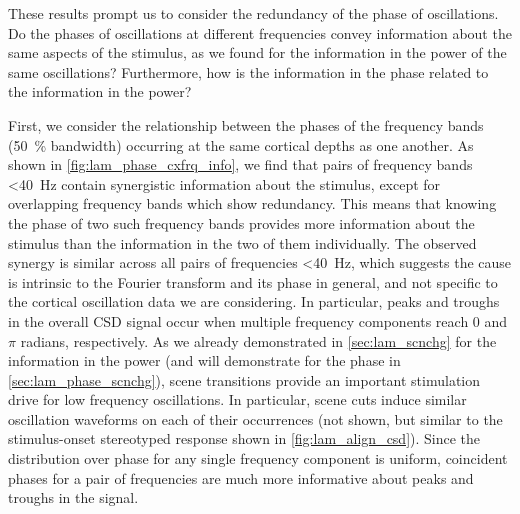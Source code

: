 These results prompt us to consider the redundancy of the phase of oscillations.
Do the phases of oscillations at different frequencies convey information about the same aspects of the stimulus, as we found for the information in the power of the same oscillations?
Furthermore, how is the information in the phase related to the information in the power?

First, we consider the relationship between the phases of the frequency bands (\SI{50}{\percent} bandwidth) occurring at the same cortical depths as one another.
As shown in \autoref{fig:lam_phase_cxfrq_info}, we find that pairs of frequency bands \SI{<40}{Hz} contain synergistic information about the stimulus, except for overlapping frequency bands which show redundancy.
This means that knowing the phase of two such frequency bands provides more information about the stimulus than the information in the two of them individually.
The observed synergy is similar across all pairs of frequencies \SI{<40}{Hz}, which suggests the cause is intrinsic to the Fourier transform and its phase in general, and not specific to the cortical oscillation data we are considering.
In particular, peaks and troughs in the overall \ac{CSD} signal occur when multiple frequency components reach $0$ and $\pi$ radians, respectively.
As we already demonstrated in \autoref{sec:lam_scnchg} for the information in the power (and will demonstrate for the phase in \autoref{sec:lam_phase_scnchg}), scene transitions provide an important stimulation drive for low frequency oscillations.
In particular, scene cuts induce similar oscillation waveforms on each of their occurrences (not shown, but similar to the stimulus-onset stereotyped response shown in \autoref{fig:lam_align_csd}).
Since the distribution over phase for any single frequency component is uniform, coincident phases for a pair of frequencies are much more informative about peaks and troughs in the signal.
%
%
%


